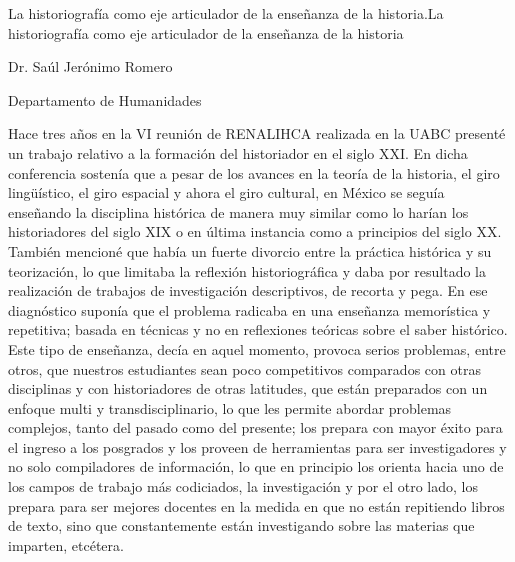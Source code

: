 %
{\centering La historiografía como eje articulador de la enseñanza de la
historia.La historiografía como eje articulador de la
enseñanza de la historia}

{\raggedleft
Dr. Saúl Jerónimo Romero
\par}
{\raggedleft
Departamento de Humanidades 
\par}


\bigskip
Hace tres años en la VI reunión de RENALIHCA realizada en la UABC 
presenté un trabajo relativo a la formación del historiador en el siglo 
XXI. En dicha conferencia sostenía que a pesar de los avances en la 
teoría de la historia, el giro lingüístico, el giro espacial y ahora el 
giro cultural, en México se seguía enseñando la disciplina histórica de 
manera muy similar como lo harían los historiadores del siglo XIX o en 
última instancia como a principios del siglo XX. También mencioné que 
había un fuerte divorcio entre la práctica histórica y su teorización, 
lo que limitaba la reflexión historiográfica y daba por resultado la 
realización de trabajos de investigación descriptivos, de recorta y 
pega. En ese diagnóstico suponía que el problema radicaba en una 
enseñanza memorística y repetitiva; basada en técnicas y no en 
reflexiones teóricas sobre el saber histórico. Este tipo de enseñanza, 
decía en aquel momento, provoca serios problemas, entre otros, que 
nuestros estudiantes sean poco competitivos comparados con otras 
disciplinas y con historiadores de otras latitudes, que están 
preparados con un enfoque multi y transdisciplinario, lo que les 
permite abordar problemas complejos, tanto del pasado como del 
presente; los prepara con mayor éxito para el ingreso a los posgrados y 
los proveen de herramientas para ser investigadores y no solo 
compiladores de información, lo que en principio los orienta hacia uno 
de los campos de trabajo más codiciados, la investigación y por el otro 
lado, los prepara para ser mejores docentes en la medida en que no 
están repitiendo libros de texto, sino que constantemente están 
investigando sobre las materias que imparten, etcétera.

